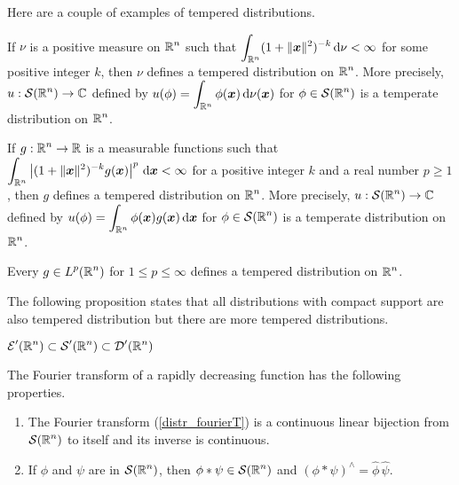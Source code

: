 \begin{egg}
Here are a couple of examples of tempered distributions.

If $\nu$ is a positive measure on $\displaystyle \mathbb{R}^n$ such that
$\displaystyle \int_{\mathbb{R}^n} (1 + \|{\bm{x}}\|^2)^{-k} \,\mathrm{d}{\nu} < \infty$
for some positive integer $k$, then $\nu$ defines a tempered
distribution on $\displaystyle \mathbb{R}^n$.  More precisely,
$\displaystyle u : \mathcal{S}(\mathbb{R}^n) \to \mathbb{C}$ defined by
$\displaystyle u(\phi) = \int_{\mathbb{R}^n} \phi({\bm{x}}) \,\mathrm{d}{\nu({\bm{x}})}$
for $\displaystyle \phi\in \mathcal{S}(\mathbb{R}^n)$ is a temperate distribution on
$\displaystyle \mathbb{R}^n$.

If $\displaystyle g:\mathbb{R}^n \to \mathbb{R}$ is a measurable functions such that
$\displaystyle \int_{\mathbb{R}^n} \left| (1+\|{\bm{x}}\|^2)^{-k} g({\bm{x}})
\right|^p \,\mathrm{d}{{\bm{x}}} < \infty$ for a positive integer $k$ and a real
number $p \geq 1$, then $g$ defines a tempered distribution on
$\displaystyle \mathbb{R}^n$.
More precisely, $\displaystyle u : \mathcal{S}(\mathbb{R}^n) \to \mathbb{C}$ defined by
$\displaystyle u(\phi) = \int_{\mathbb{R}^n} \phi({\bm{x}}) g({\bm{x}}) \,\mathrm{d}{{\bm{x}}}$
for $\displaystyle \phi\in \mathcal{S}(\mathbb{R}^n)$ is a temperate distribution on
$\displaystyle \mathbb{R}^n$.

Every $\displaystyle g \in L^p(\mathbb{R}^n)$ for $1 \leq p \leq \infty$
defines a tempered distribution on $\displaystyle \mathbb{R}^n$.
\end{egg}

The following proposition states that all distributions with compact
support are also tempered distribution but there are more tempered
distributions.

\begin{prop}
$\displaystyle \mathcal{E}'(\mathbb{R}^n) \subset \mathcal{S}'(\mathbb{R}^n) \subset \mathcal{D}'(\mathbb{R}^n)$
\end{prop}

The Fourier transform of a rapidly decreasing function has the
following properties.

\begin{prop} \label{distr_frr_tempT}
\begin{enumerate}
\item The Fourier transform (\ref{distr_fourierT}) is a continuous
linear bijection from $\displaystyle \mathcal{S}(\mathbb{R}^n)$ to itself and its inverse is
continuous.
\item If $\phi$ and $\psi$ are in $\displaystyle \mathcal{S}(\mathbb{R}^n)$, then
$\displaystyle \phi \ast \psi \in \mathcal{S}(\mathbb{R}^n)$ and 
$\displaystyle (\phi\ast \psi)^\wedge = \hat{\phi}\,\hat{\psi}$.
\end{enumerate}
\end{prop}


